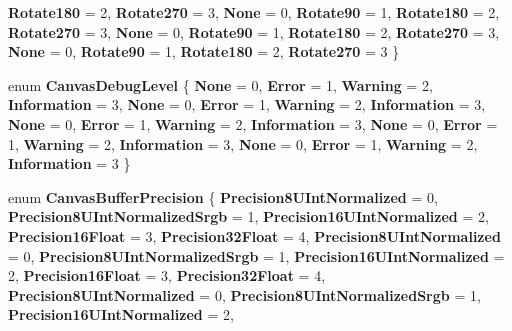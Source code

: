 \begin{DoxyCompactItemize}
{\bfseries Rotate180} = 2, 
{\bfseries Rotate270} = 3, 
\newline
{\bfseries None} = 0, 
{\bfseries Rotate90} = 1, 
{\bfseries Rotate180} = 2, 
{\bfseries Rotate270} = 3, 
\newline
{\bfseries None} = 0, 
{\bfseries Rotate90} = 1, 
{\bfseries Rotate180} = 2, 
{\bfseries Rotate270} = 3, 
\newline
{\bfseries None} = 0, 
{\bfseries Rotate90} = 1, 
{\bfseries Rotate180} = 2, 
{\bfseries Rotate270} = 3
 \}
\item 
\mbox{\label{namespace_microsoft_1_1_graphics_1_1_canvas_a2ef0aec53b3f7fd6d2b7d2fe3f4cec34}} 
enum {\bfseries Canvas\+Debug\+Level} \{ \newline
{\bfseries None} = 0, 
{\bfseries Error} = 1, 
{\bfseries Warning} = 2, 
{\bfseries Information} = 3, 
\newline
{\bfseries None} = 0, 
{\bfseries Error} = 1, 
{\bfseries Warning} = 2, 
{\bfseries Information} = 3, 
\newline
{\bfseries None} = 0, 
{\bfseries Error} = 1, 
{\bfseries Warning} = 2, 
{\bfseries Information} = 3, 
\newline
{\bfseries None} = 0, 
{\bfseries Error} = 1, 
{\bfseries Warning} = 2, 
{\bfseries Information} = 3, 
\newline
{\bfseries None} = 0, 
{\bfseries Error} = 1, 
{\bfseries Warning} = 2, 
{\bfseries Information} = 3
 \}
\item 
\mbox{\label{namespace_microsoft_1_1_graphics_1_1_canvas_a9383a4c9a246b43c162a06fc29843c53}} 
enum {\bfseries Canvas\+Buffer\+Precision} \{ \newline
{\bfseries Precision8\+U\+Int\+Normalized} = 0, 
{\bfseries Precision8\+U\+Int\+Normalized\+Srgb} = 1, 
{\bfseries Precision16\+U\+Int\+Normalized} = 2, 
{\bfseries Precision16\+Float} = 3, 
\newline
{\bfseries Precision32\+Float} = 4, 
{\bfseries Precision8\+U\+Int\+Normalized} = 0, 
{\bfseries Precision8\+U\+Int\+Normalized\+Srgb} = 1, 
{\bfseries Precision16\+U\+Int\+Normalized} = 2, 
\newline
{\bfseries Precision16\+Float} = 3, 
{\bfseries Precision32\+Float} = 4, 
{\bfseries Precision8\+U\+Int\+Normalized} = 0, 
{\bfseries Precision8\+U\+Int\+Normalized\+Srgb} = 1, 
\newline
{\bfseries Precision16\+U\+Int\+Normalized} = 2, 

\end{DoxyCompactItemize}
